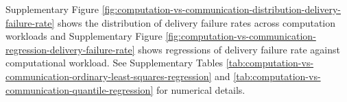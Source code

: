 Supplementary Figure \ref{fig:computation-vs-communication-distribution-delivery-failure-rate} shows the distribution of delivery failure rates across computation workloads and Supplementary Figure \ref{fig:computation-vs-communication-regression-delivery-failure-rate} shows regressions of delivery failure rate against computational workload.
See Supplementary Tables \ref{tab:computation-vs-communication-ordinary-least-squares-regression} and \ref{tab:computation-vs-communication-quantile-regression} for numerical details.
